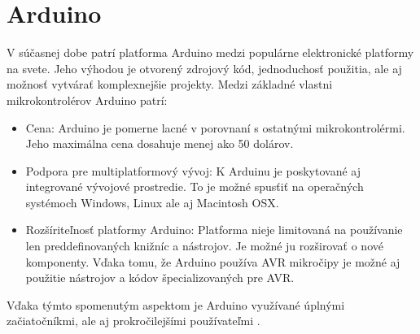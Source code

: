 \section{Arduino}
\noindent

V súčasnej dobe patrí platforma Arduino medzi populárne elektronické platformy na svete.
Jeho výhodou je otvorený zdrojový kód, jednoduchosť použitia, ale aj možnosť vytvárať komplexnejšie projekty.
Medzi základné vlastni mikrokontrolérov Arduino patrí:

\begin{itemize}
    \item Cena: Arduino je pomerne lacné v porovnaní s ostatnými mikrokontrolérmi. Jeho maximálna cena dosahuje menej ako 50 dolárov.
    \item Podpora pre multiplatformový vývoj: K Arduinu je poskytované aj integrované vývojové prostredie. To je možné spusťiť na operačných systémoch Windows, Linux
          ale aj Macintosh OSX.
    \item Rozšíriteľnosť platformy Arduino: Platforma nieje limitovaná na používanie len preddefinovaných knižníc a nástrojov. Je možné ju rozširovať o nové komponenty. Vďaka tomu, že Arduino používa AVR mikročipy je možné aj použitie nástrojov a kódov špecializovaných pre AVR.
\end{itemize}

Vďaka týmto spomenutým aspektom je Arduino využívané úplnými začiatočníkmi, ale aj prokročilejšími používateľmi \cite{WhatArduinoArduino}.